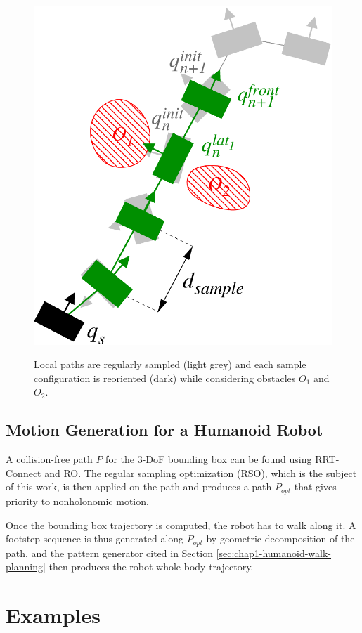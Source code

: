\begin{figure}
  \centering
      {\includegraphics[width = 0.6\linewidth]
        {src/chap1-path-optimization/hash-direct-path.pdf}}
      \caption[Sample configurations are reoriented on local
        paths.]{Local paths are regularly sampled (light grey) and
        each sample configuration is reoriented (dark) while
        considering obstacles $O_1$ and $O_2$.}
      \label{fig:chap1-hash-direct-path}
\end{figure}

\subsection{Motion Generation for a Humanoid Robot}

A collision-free path $P$ for the 3-DoF bounding box can be found
using RRT-Connect and RO. The regular sampling optimization (RSO),
which is the subject of this work, is then applied on the path and
produces a path $P_{opt}$ that gives priority to nonholonomic motion.

Once the bounding box trajectory is computed, the robot has to walk
along it. A footstep sequence is thus generated along $P_{opt}$ by
geometric decomposition of the path, and the pattern generator cited
in Section \ref{sec:chap1-humanoid-walk-planning} then produces the
robot whole-body trajectory.

\section{Examples}
\label{sec:chap1-examples}


